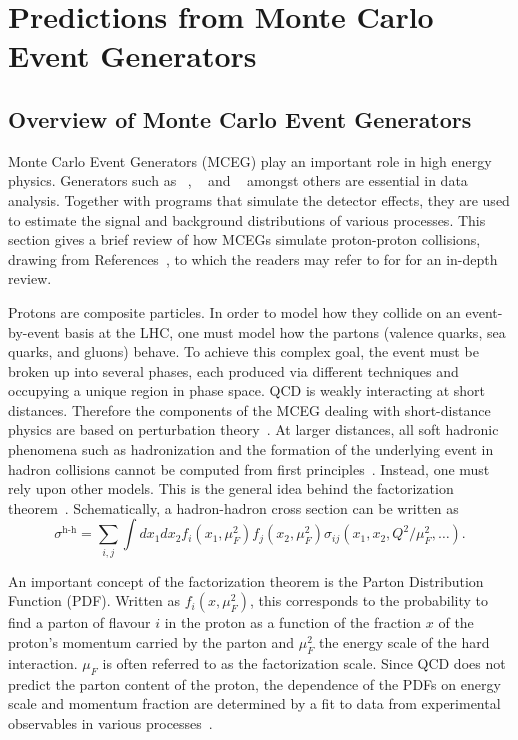 \section{Predictions from Monte Carlo Event Generators}
\subsection{Overview of Monte Carlo Event Generators}
\label{sec:mceg}
Monte Carlo Event Generators (MCEG) play an important role in high energy physics. Generators such as \herwig{}~\cite{Bellm:2017bvx}, \pythia{}~\cite{Sjostrand:2006za} and \SHERPA~\cite{Gleisberg:2008ta} amongst others are essential in data analysis. Together with programs that simulate the detector effects, they are used to estimate the signal and background distributions of various processes. This section gives a brief review of how MCEGs simulate proton-proton collisions, drawing from References~\cite{seymour2013monte,hoche2015introduction,pdg_2021}, to which the readers may refer to for for an in-depth review. 

Protons are composite particles. In order to model how they collide on an event-by-event basis at the LHC, one must model how the partons (valence quarks, sea quarks, and gluons) behave. To achieve this complex goal, the event must be broken up into several phases, each produced via different techniques and occupying a unique region in phase space. QCD is weakly interacting at short distances. Therefore the components of the MCEG dealing with short-distance physics are based on perturbation theory~\cite{pdg}. At larger distances, all soft hadronic phenomena such as hadronization and the formation of the underlying event in hadron collisions cannot be computed from first principles~\cite{pdg}. Instead, one must rely upon other models. This is the general idea behind the factorization theorem~\cite{Botje_lecture}. Schematically, a hadron-hadron cross section can be written as
\begin{equation}
    \sigma^{\text{h-h}} = \sum_{i,j}\int dx_1 dx_2 f_i(x_1,\mu_F^2) f_j(x_2,\mu_F^2)\hat{\sigma}_{ij}(x_1,x_2,Q^2/\mu_F^2,\dots).
\end{equation}

An important concept of the factorization theorem is the Parton Distribution Function (PDF). Written as $f_i(x,\mu_F^2)$, this corresponds to the probability to find a parton of flavour $i$ in the proton as a function of the fraction $x$ of the proton’s momentum carried by the parton and $\mu_F^2$ the energy scale of the hard interaction. $\mu_F$ is often referred to as the factorization scale. Since QCD does not predict the parton content of the proton, the dependence of the PDFs on energy scale and momentum fraction are determined by a fit to data from experimental observables in various processes~\cite{placakyte2011parton}.

